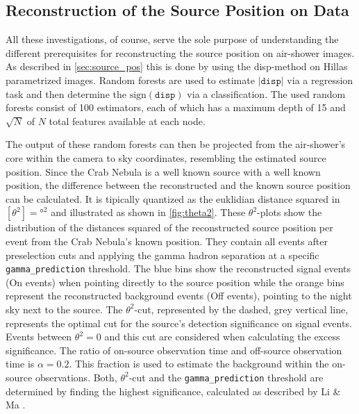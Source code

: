\subsection{Reconstruction of the Source Position on Data}

All these investigations, of course, serve the sole purpose of understanding
the different prerequisites for reconstructing the source position on
air-shower images. As described in \autoref{sec:source_pos} this is done by
using the disp-method on Hillas parametrized images. Random forests
are used to estimate $|\texttt{disp}|$ via a regression task and then determine
the $\text{sign}(\texttt{disp})$ via a classification. The used random forests
consist of \num{100} estimators, each of which has a maximum depth of \num{15} and $\sqrt{N}$ of $N$ total features available at each node.

The output of these random forests can then be projected from the air-shower's
core within the camera to sky coordinates, resembling the estimated source
position. Since the Crab Nebula is a well known source with a well known
position, the difference between the reconstructed and the known source
position can be calculated. It is tipically quantized as the euklidian distance
squared in $[\theta^2] = \si{\degree\squared}$ and illustrated as shown in
\autoref{fig:theta2}. These $\theta^2$-plots show the distribution of the
distances squared of the reconstructed source position per event from the Crab
Nebula's known position. They contain all events after preselection cuts and
applying the gamma hadron separation at a specific \texttt{gamma\_prediction}
threshold. The blue bins show the reconstructed signal events (On events) when
pointing directly to the source position while the orange bins represent the
reconstructed background events (Off events), pointing to the night sky next to
the source. The $\theta^2$-cut, represented by the dashed, grey vertical line,
represents the optimal cut for the source's detection significance on signal events. Events between $\theta^2 = 0$ and this cut are considered when calculating the excess significance.
The ratio of on-source observation time and off-source observation time is
$\alpha = 0.2$. This fraction is used to estimate the background within the
on-source observations. Both, $\theta^2$-cut and the \texttt{gamma\_prediction}
threshold are determined by finding the highest significance, calculated as
described by Li \& Ma \cite{LiMa}.

